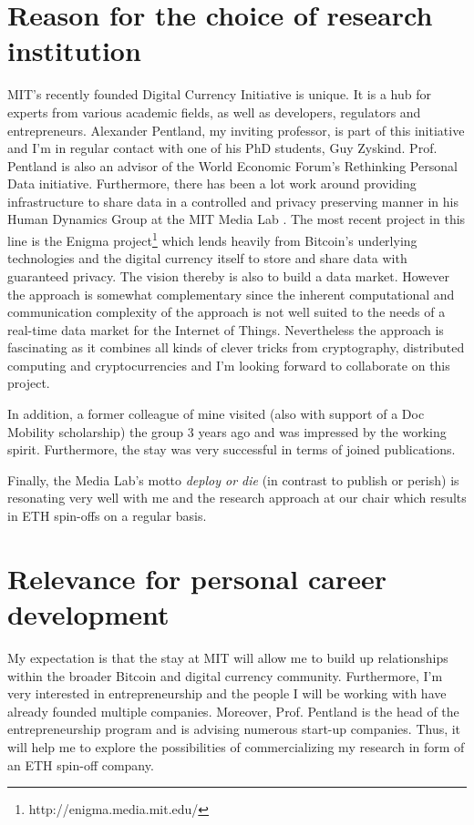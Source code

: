 \documentclass[a4paper, 12pt]{scrartcl}
\begin{document}
\section{Reason for the choice of research institution}

MIT's recently founded Digital Currency Initiative is unique. It is a hub for experts from various academic fields, as well as developers, regulators and entrepreneurs. Alexander Pentland, my inviting professor, is part of this initiative and I'm in regular contact with one of his PhD students, Guy Zyskind. Prof. Pentland is also an advisor of the World Economic Forum's Rethinking Personal Data initiative. Furthermore, there has been a lot work around providing infrastructure to share data \parencite{Aharony:2011:SFI:2072697.2073099} in a controlled and privacy preserving manner in his Human Dynamics Group at the MIT Media Lab \parencite{deMontjoye:2014ip}.
The most recent project in this line is the Enigma project\footnote{http://enigma.media.mit.edu/} which lends heavily from Bitcoin's underlying technologies and the digital currency itself to store and share data with guaranteed privacy. The vision thereby is also to build a data market. However the approach is somewhat complementary since the inherent computational and communication complexity of the approach is not well suited to the needs of a real-time data market for the Internet of Things. Nevertheless the approach is fascinating as it combines all kinds of clever tricks from cryptography, distributed computing and cryptocurrencies and I'm looking forward to collaborate on this project.  

In addition, a former colleague of mine visited (also with support of a Doc Mobility scholarship) the group 3 years ago and was impressed by the working spirit. Furthermore, the stay was very successful in terms of joined publications.

Finally, the Media Lab's motto \textit{deploy or die} (in contrast to publish or perish) is resonating very well with me and the research approach at our chair which results in ETH spin-offs on a regular basis.  

\section{Relevance for personal career development}


My expectation is that the stay at MIT will allow me to build up relationships within the broader Bitcoin and digital currency community. Furthermore, I'm very interested in entrepreneurship and the people I will be working with have already founded multiple companies. Moreover, Prof. Pentland is the head of the entrepreneurship program and is advising numerous start-up companies. Thus, it will help me to explore the possibilities of commercializing my research in form of an ETH spin-off company. 
\end{document}
